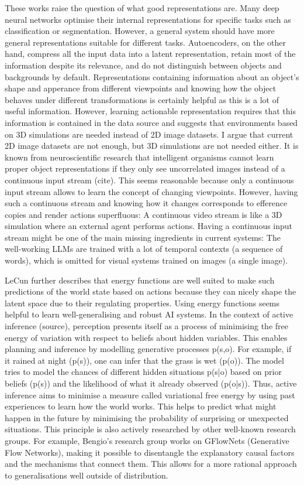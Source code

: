 These works raise the question of what good representations are. Many deep neural networks optimise their internal representations for specific tasks such as classification or segmentation. However, a general system should have more general representations suitable for different tasks. Autoencoders, on the other hand, compress all the input data into a latent representation, retain most of the information despite its relevance, and do not distinguish between objects and backgrounds by default. Representations containing information about an object's shape and apperance from different viewpoints and knowing how the object behaves under different transformations is certainly helpful as this is a lot of useful information. However, learning actionable representation requires that this information is contained in the data source and suggests that environments based on 3D simulations are needed instead of 2D image datasets. I argue that current 2D image datasets are not enough, but 3D simulations are not needed either. It is known from neuroscientific research that intelligent organisms cannot learn proper object representations if they only see uncorrelated images instead of a continuous input stream (cite). This seems reasonable because only a continuous input stream allows to learn the concept of changing viewpoints. However, having such a continuous stream and knowing how it changes corresponds to efference copies and render actions superfluous: A continuous video stream is like a 3D simulation where an external agent performs actions. Having a continuous input stream might be one of the main missing ingredients in current systems: The well-working LLMs are trained with a lot of temporal contexts (a sequence of words), which is omitted for visual systems trained on images (a single image). 

LeCun further describes that energy functions are well suited to make such predictions of the world state based on actions because they can nicely shape the latent space due to their regulating properties.
Using energy functions seems helpful to learn well-generalising and robust AI systems. In the context of active inference (source), perception presents itself as a process of minimising the free energy of variation with respect to beliefs about hidden variables. This enables planning and inference by modelling generative processes p(s,o). For example, if it rained at night (p(s)), one can infer that the grass is wet (p(o)). The model tries to model the chances of different hidden situations p(s|o) based on prior beliefs (p(s)) and the likelihood of what it already observed (p(o|s)). 
Thus, active inference aims to minimise a measure called variational free energy by using past experiences to learn how the world works. This helps to predict what might happen in the future by minimising the probability of surprising or unexpected situations.
This principle is also actively researched by other well-known research groups. For example, Bengio's research group works on GFlowNets (Generative Flow Networks), making it possible to disentangle the explanatory causal factors and the mechanisms that connect them. This allows for a more rational approach to generalisations well outside of distribution.

